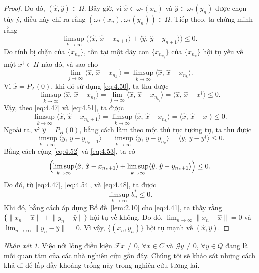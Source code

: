 \documentclass{MyBook}
\theoremstyle{plain}
\theoremstyle{definition}
\theoremstyle{remark}
\newtheorem{remark}[theorem]{Nhận xét}
\numberwithin{equation}{chapter}
\newcommand{\Fc}{\mathcal{F}}
\newcommand{\Gc}{\mathcal{G}}
\newcommand{\inp}[2]{\langle #1,\,#2\rangle}
\newcommand{\nm}[1]{\lVert #1\rVert}
\begin{document}
\begin{proof}
Do đó, $(\hat{x},\hat{y})\in\Omega$. Bây giờ, vì $\hat{x}\in\omega_{*}(x_n)$ và $\hat{y}\in\omega_{*}(y_n)$ được chọn tùy ý, điều này chỉ ra rằng $(\omega_{*}(x_n),\omega_{*}(y_n))\in\Omega$. Tiếp theo, ta chứng minh rằng
\[
\limsup_{k\to\infty}\bigl(\inp{\hat{x}}{\hat{x}-x_{n+1}}+\inp{\hat{y}}{\hat{y}-y_{n+1}}\bigr)\le 0.
\]
Do tính bị chặn của $\{x_{n_k}\}$, tồn tại một dãy con $\{x_{n_{k_j}}\}$ của $\{x_{n_k}\}$ hội tụ yếu về một $x^{\dagger}\in H$ nào đó, và sao cho
\begin{equation}
\lim_{j\to\infty}\inp{\hat{x}}{\hat{x}-x_{n_{k_j}}}=\limsup_{k\to\infty}\inp{\hat{x}}{\hat{x}-x_{n_k}}. \label{eq:4.50}
\end{equation}
Vì $\hat{x}=P_A(0)$, khi đó sử dụng \eqref{eq:4.50}, ta thu được
\begin{equation}
\limsup_{k\to\infty}\inp{\hat{x}}{\hat{x}-x_{n_k}}=\lim_{j\to\infty}\inp{\hat{x}}{\hat{x}-x_{n_{k_j}}}=\inp{\hat{x}}{\hat{x}-x^{\dagger}}\le 0. \label{eq:4.51}
\end{equation}
Vậy, theo \eqref{eq:4.47} và \eqref{eq:4.51}, ta được
\begin{equation}
\limsup_{k\to\infty}\inp{\hat{x}}{\hat{x}-x_{n_k+1}}=\limsup_{k\to\infty}\inp{\hat{x}}{\hat{x}-x_{n_k}}=\inp{\hat{x}}{\hat{x}-x^{\dagger}}\le 0. \label{eq:4.52}
\end{equation}
Ngoài ra, vì $\hat{y}=P_B(0)$, bằng cách làm theo một thủ tục tương tự, ta thu được
\begin{equation}
\limsup_{k\to\infty}\inp{\hat{y}}{\hat{y}-y_{n_k+1}}=\limsup_{k\to\infty}\inp{\hat{y}}{\hat{y}-y_{n_k}}=\inp{\hat{y}}{\hat{y}-y^{\dagger}}\le 0. \label{eq:4.53}
\end{equation}
Bằng cách cộng \eqref{eq:4.52} và \eqref{eq:4.53}, ta có
\begin{equation}
\Bigl(\limsup_{k\to\infty}\inp{\hat{x}}{\hat{x}-x_{n_k+1}}+\limsup_{k\to\infty}\inp{\hat{y}}{\hat{y}-y_{n_k+1}}\Bigr)\le 0. \label{eq:4.54}
\end{equation}
Do đó, từ \eqref{eq:4.47}, \eqref{eq:4.54}, và \eqref{eq:4.48}, ta được
\[
\limsup_{k\to\infty}b_n^{*}\le 0.
\]
Khi đó, bằng cách áp dụng Bổ đề~\ref{lem:2.10} cho \eqref{eq:4.41}, ta thấy rằng $\{\nm{x_n-\hat{x}}+\nm{y_n-\hat{y}}\}$ hội tụ về không. Do đó, $\lim_{n\to\infty}\nm{x_n-\hat{x}}=0$ và $\lim_{n\to\infty}\nm{y_n-\hat{y}}=0$. Vì vậy, $\{(x_n,y_n)\}$ hội tụ mạnh về $(\hat{x},\hat{y})$.
\end{proof}

\begin{remark}
Việc nới lỏng điều kiện $\Fc x\ne 0$, $\forall x\in C$ và $\Gc y\ne 0$, $\forall y\in Q$ đang là mối quan tâm của các nhà nghiên cứu gần đây. Chúng tôi sẽ khảo sát những cách khả dĩ để lấp đầy khoảng trống này trong nghiên cứu tương lai.
\end{remark}
\end{document}
